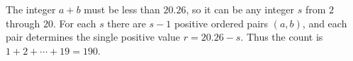 The integer $a+b$ must be less than $20.26$, so it can be any integer $s$ from $2$ through $20$. For each $s$ there are $s-1$ positive ordered pairs $(a,b)$, and each pair determines the single positive value $r=20.26-s$. Thus the count is $1+2+\cdots+19=\boxed{190}$.
